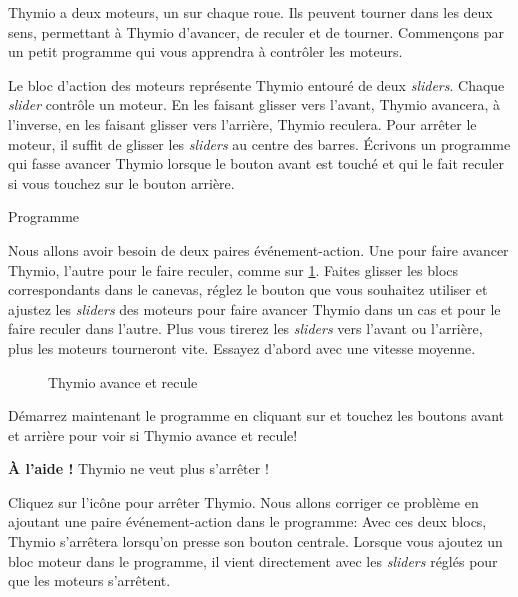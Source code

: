 \label{c.moving}


Thymio a deux moteurs, un sur chaque roue.
Ils peuvent tourner dans les deux sens, permettant à Thymio d'avancer, de reculer et de tourner. Commençons par un petit programme qui vous apprendra à contrôler les moteurs.

Le bloc d'action des moteurs  représente Thymio entouré de deux \textit{sliders}.
Chaque \textit{slider} contrôle un moteur.
En les faisant glisser vers l'avant, Thymio avancera, à l'inverse, en les faisant glisser vers l'arrière, Thymio reculera.
Pour arrêter le moteur, il suffit de glisser les \textit{sliders} au centre des barres.
Écrivons un programme qui fasse avancer Thymio lorsque le bouton avant est touché et qui le fait reculer si vous touchez sur le bouton arrière.

{\raggedleft \hfill Programme }

Nous allons avoir besoin de deux paires événement-action. Une pour faire avancer Thymio, l'autre pour le faire reculer, comme sur \cref{fig.nostop}. Faites glisser les blocs correspondants dans le canevas, réglez le bouton que vous souhaitez utiliser et ajustez les \textit{sliders} des moteurs pour faire avancer Thymio dans un cas et pour le faire reculer dans l'autre. Plus vous tirerez les \textit{sliders} vers l'avant ou l'arrière, plus les moteurs tourneront vite. Essayez d'abord avec une vitesse moyenne.

\begin{figure}
\begin{center}
\caption{Thymio avance et recule}\label{fig.nostop}
\end{center}
\end{figure}

Démarrez maintenant le programme en cliquant sur  et touchez les boutons avant et arrière pour voir si Thymio avance et recule!


\textbf{À l'aide !} Thymio ne veut plus s'arrêter !

Cliquez sur l'icône  pour arrêter Thymio.
Nous allons corriger ce problème en ajoutant une paire événement-action dans le programme: 
Avec ces deux blocs, Thymio s'arrêtera lorsqu'on presse son bouton centrale.
Lorsque vous ajoutez un bloc moteur dans le programme, il vient directement avec les \textit{sliders} réglés pour que les moteurs s'arrêtent.

